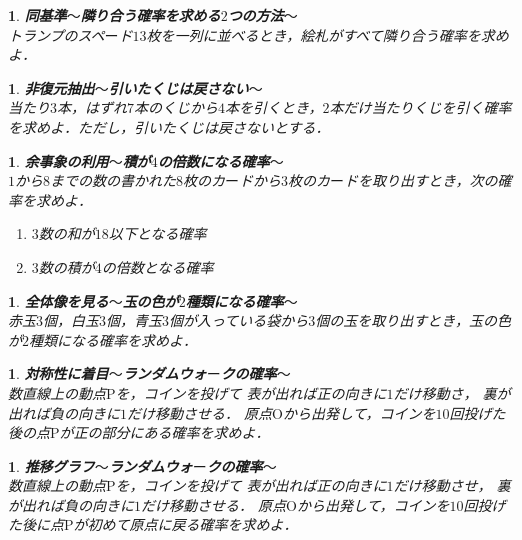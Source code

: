 \documentclass[10pt,
fleqn,
dvipdfmx,
uplatex
]{jsarticle}
\newtheorem{question}[Question]{}
\begin{document}
\begin{question}{\bf\boldmath 同基準$〜$隣り合う確率を求める$2$つの方法$〜$}\\
トランプのスペ$ー$ド${13}$枚を一列に並べるとき，絵札がすべて隣り合う確率を求めよ．
\end{question}



\begin{question}{\bf\boldmath 非復元抽出$〜$引いたくじは戻さない$〜$}\\
当たり$3$本，はずれ$7$本のくじから$4$本を引くとき，$2$本だけ当たりくじを引く確率を求めよ．ただし，引いたくじは戻さないとする．
\end{question}



\begin{question}{\bf\boldmath 余事象の利用$〜$積が$4$の倍数になる確率$〜$}\\
$1$から$8$までの数の書かれた$8$枚のカ$ー$ドから$3$枚のカ$ー$ドを取り出すとき，次の確率を求めよ．
\begin{enumerate}
\item $3$数の和が${18}$以下となる確率
\item $3$数の積が$4$の倍数となる確率
\end{enumerate}

\end{question}



\begin{question}{\bf\boldmath 全体像を見る$〜$玉の色が$2$種類になる確率$〜$}\\
赤玉$3$個，白玉$3$個，青玉$3$個が入っている袋から$3$個の玉を取り出すとき，玉の色が$2$種類になる確率を求めよ．
\end{question}



\begin{question}{\bf\boldmath 対称性に着目$〜$ランダムウォ$ー$クの確率$〜$}\\
数直線上の動点$\text{P}$を，コインを投げて
表が出れば正の向きに$1$だけ移動さ，
裏が出れば負の向きに$1$だけ移動させる．
原点$\text{O}$から出発して，コインを${10}$回投げた後の点$\text{P}$が正の部分にある確率を求めよ．
\end{question}



\begin{question}{\bf\boldmath 推移グラフ$〜$ランダムウォ$ー$クの確率$〜$}\\
数直線上の動点$\text{P}$を，コインを投げて
表が出れば正の向きに$1$だけ移動させ，
裏が出れば負の向きに$1$だけ移動させる．
原点$\text{O}$から出発して，コインを${10}$回投げた後に点$\text{P}$が初めて原点に戻る確率を求めよ．
\end{question}
\end{document}
